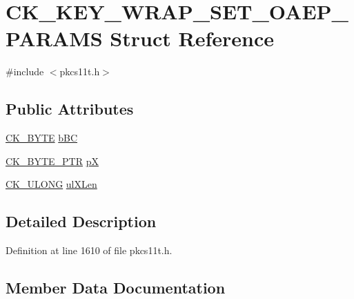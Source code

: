 \hypertarget{struct_c_k___k_e_y___w_r_a_p___s_e_t___o_a_e_p___p_a_r_a_m_s}{}\section{C\+K\+\_\+\+K\+E\+Y\+\_\+\+W\+R\+A\+P\+\_\+\+S\+E\+T\+\_\+\+O\+A\+E\+P\+\_\+\+P\+A\+R\+A\+MS Struct Reference}
\label{struct_c_k___k_e_y___w_r_a_p___s_e_t___o_a_e_p___p_a_r_a_m_s}


{\ttfamily \#include $<$pkcs11t.\+h$>$}

\subsection*{Public Attributes}
\begin{DoxyCompactItemize}
\item 
\hyperlink{pkcs11t_8h_a51e605f881c86838bf12d70707b57b85}{C\+K\+\_\+\+B\+Y\+TE} \hyperlink{struct_c_k___k_e_y___w_r_a_p___s_e_t___o_a_e_p___p_a_r_a_m_s_a1f3cb5ec14d0842ca41e2a93beb4415f}{b\+BC}
\item 
\hyperlink{pkcs11t_8h_a3d7233a4077fbaf7ae76b64da0a62a21}{C\+K\+\_\+\+B\+Y\+T\+E\+\_\+\+P\+TR} \hyperlink{struct_c_k___k_e_y___w_r_a_p___s_e_t___o_a_e_p___p_a_r_a_m_s_a1a897d4e201679b8114b516ea168efa6}{pX}
\item 
\hyperlink{pkcs11t_8h_a35181858a3b7a0a81f49d180d8f446ef}{C\+K\+\_\+\+U\+L\+O\+NG} \hyperlink{struct_c_k___k_e_y___w_r_a_p___s_e_t___o_a_e_p___p_a_r_a_m_s_a42f36d257351e4712540a5f8116076d2}{ul\+X\+Len}
\end{DoxyCompactItemize}


\subsection{Detailed Description}


Definition at line 1610 of file pkcs11t.\+h.



\subsection{Member Data Documentation}
\mbox{\label{struct_c_k___k_e_y___w_r_a_p___s_e_t___o_a_e_p___p_a_r_a_m_s_a1f3cb5ec14d0842ca41e2a93beb4415f}} 
